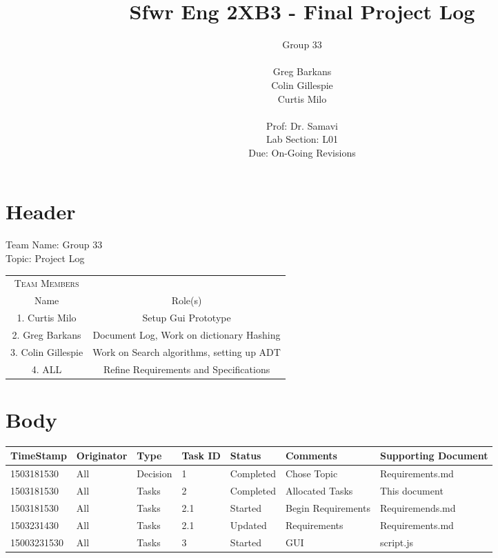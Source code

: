 \documentclass[10pt, oneside]{article}
\title{Sfwr Eng 2XB3 - Final Project Log}
\author{
	Group 33   \\ \\ 
	Greg Barkans \\
	Colin Gillespie \\
	Curtis Milo \\
	 \vspace{2cm} \\
	Prof: Dr. Samavi \\
	Lab Section: L01 \\
	Due: On-Going Revisions \\	
}
\date{}
\begin{document}
\maketitle
\newpage


\section{Header}
Team Name: Group 33 \\
Topic: Project Log

\vspace{1cm}

\begin{tabular}{c|c}

	\textsc{Team Members} & \\
	Name & Role(s) \\
	\hline
	1. Curtis Milo & Setup Gui Prototype \\
	2. Greg Barkans & Document Log, Work on dictionary Hashing \\
	3. Colin Gillespie & Work on Search algorithms, setting up ADT \\
	4. ALL & Refine Requirements and Specifications 
\end{tabular}



\section{Body}

\setlength{\tabcolsep}{5pt}
\begin{tabular}{p{2cm}|p{1.75cm}|p{1.25cm}|p{1cm}|p{2cm}|p{3cm}|p{2cm}}

	\hline
	TimeStamp & Originator & Type & Task ID & Status & Comments & Supporting Document \\
	\hline
	1503181530 & All & Decision & 1 & Completed & Chose Topic & Requirements.md \\
	\hline
	1503181530 & All & Tasks & 2 & Completed & Allocated Tasks & This document \\
	\hline
	1503181530 & All & Tasks & 2.1 & Started & Begin Requirements & Requiremends.md \\
	1503231430 & All & Tasks & 2.1 & Updated & Requirements & Requirements.md \\
	15003231530 & All & Tasks & 3 & Started & GUI & script.js \\
\end{tabular}
\end{document}

